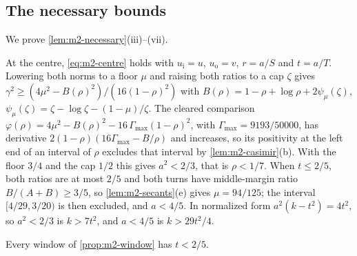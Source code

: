\subsection{The necessary bounds}\label{app:m2-bounds}

We prove \cref{lem:m2-necessary}(iii)--(vii).

 At the centre, \eqref{eq:m2-centre} holds with $u_{\mathrm i}=u$,
$u_{\mathrm o}=v$, $r=a/S$ and $t=a/T$. Lowering both norms to a floor $\mu$ and raising both ratios
to a cap $\zeta$ gives $\gamma^2\ge(4\mu^2-B(\rho)^2)/(16(1-\rho)^2)$ with
$B(\rho)=1-\rho+\log\rho+2\psi_\mu(\zeta)$, $\psi_\mu(\zeta)=\zeta-\log\zeta-(1-\mu)/\zeta$. The
cleared comparison $\varphi(\rho)=4\mu^2-B(\rho)^2-16\,\Gamma_{\max}(1-\rho)^2$, with
$\Gamma_{\max}=9193/50000$, has derivative $2(1-\rho)(16\Gamma_{\max}-B/\rho)$ and increases, so its
positivity at the left end of an interval of $\rho$ excludes that interval by
\cref{lem:m2-casimir}(b). With the floor $3/4$ and the cap $1/2$ this gives $a^2<2/3$, that is
$\rho<1/7$. When $t\le2/5$, both ratios are at most $2/5$ and both turns have middle-margin ratio
$B/(A+B)\ge3/5$, so \cref{lem:m2-secants}(e) gives $\mu=94/125$; the interval $[4/29,3/20)$ is then
excluded, and $a<4/5$. In normalized form $a^2(k-t^2)=4t^2$, so $a^2<2/3$ is $k>7t^2$, and $a<4/5$
is $k>29t^2/4$.

\begin{lemma}\label{lem:m2-high-t}
Every window of \cref{prop:m2-window} has $t<2/5$.
\end{lemma}

